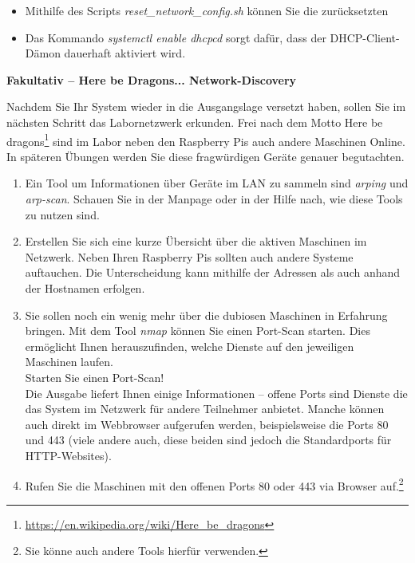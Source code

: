 \documentclass[paper=a4,fontsize=11pt]{scrartcl}%
\numberwithin{equation}{section}
\begin{document}
\begin{itemize}
\begin{tasks}
	\begin{itemize}
		\item Mithilfe des Scripts \emph{reset\_network\_config.sh} können Sie die  zurücksetzten
		\item Das Kommando \emph{systemctl enable dhcpcd} sorgt dafür, dass der DHCP-Client-Dämon dauerhaft aktiviert wird.
	\end{itemize}
\end{tasks}
\end{itemize}

\begin{center}\Large{\textbf{Fakultativ -- Here be Dragons... Network-Discovery}}\end{center}\vskip0.25in
Nachdem Sie Ihr System wieder in die Ausgangslage versetzt haben, sollen Sie im nächsten Schritt das Labornetzwerk erkunden. Frei nach dem Motto \glqq Here be dragons\grqq \footnote{\url{https://en.wikipedia.org/wiki/Here_be_dragons}} sind im Labor neben den Raspberry Pis auch andere Maschinen Online. In späteren Übungen werden Sie diese fragwürdigen Geräte genauer begutachten.
\begin{enumerate}
	\item Ein Tool um Informationen über Geräte im LAN zu sammeln sind \emph{arping} und \emph{arp-scan}. Schauen Sie in der Manpage oder in der Hilfe nach, wie diese Tools zu nutzen sind. 
	\item Erstellen Sie sich eine kurze Übersicht über die aktiven Maschinen im Netzwerk. Neben Ihren Raspberry Pis sollten auch andere Systeme auftauchen. Die Unterscheidung kann mithilfe der Adressen als auch anhand der Hostnamen erfolgen.
	\item Sie sollen noch ein wenig mehr über die dubiosen Maschinen in Erfahrung bringen. Mit dem Tool \emph{nmap} können Sie einen Port-Scan starten. Dies ermöglicht Ihnen herauszufinden, welche Dienste auf den jeweiligen Maschinen laufen.\\
	Starten Sie einen Port-Scan!\\
	Die Ausgabe liefert Ihnen einige Informationen -- offene Ports sind Dienste die das System im Netzwerk für andere Teilnehmer anbietet. Manche können auch direkt im Webbrowser aufgerufen werden, beispielsweise die Ports 80 und 443 (viele andere auch, diese beiden sind jedoch die Standardports für HTTP-Websites).
	\item Rufen Sie die Maschinen mit den offenen Ports 80 oder 443 via Browser auf.\footnote{Sie könne auch andere Tools hierfür verwenden.}
\end{enumerate}
\end{document}

